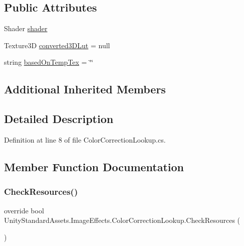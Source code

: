 \subsection*{Public Attributes}
\begin{DoxyCompactItemize}
\item 
Shader \mbox{\hyperlink{class_unity_standard_assets_1_1_image_effects_1_1_color_correction_lookup_a9b8af0c83a74f9930705c1bf4a14d236}{shader}}
\item 
Texture3D \mbox{\hyperlink{class_unity_standard_assets_1_1_image_effects_1_1_color_correction_lookup_af350058ffe0b24dcb61a7b0b98160c47}{converted3\+D\+Lut}} = null
\item 
string \mbox{\hyperlink{class_unity_standard_assets_1_1_image_effects_1_1_color_correction_lookup_a8775b4fe40aa38f5b0d755a434c6ca93}{based\+On\+Temp\+Tex}} = \char`\"{}\char`\"{}
\end{DoxyCompactItemize}
\subsection*{Additional Inherited Members}


\subsection{Detailed Description}


Definition at line 8 of file Color\+Correction\+Lookup.\+cs.



\subsection{Member Function Documentation}
\mbox{\label{class_unity_standard_assets_1_1_image_effects_1_1_color_correction_lookup_a509c6ad96fc5b0d58ac768c076bd84cf}} 
\subsubsection{\texorpdfstring{Check\+Resources()}{CheckResources()}}
{\footnotesize\ttfamily override bool Unity\+Standard\+Assets.\+Image\+Effects.\+Color\+Correction\+Lookup.\+Check\+Resources (\begin{DoxyParamCaption}{ }\end{DoxyParamCaption})\hspace{0.3cm}{\ttfamily [virtual]}}



